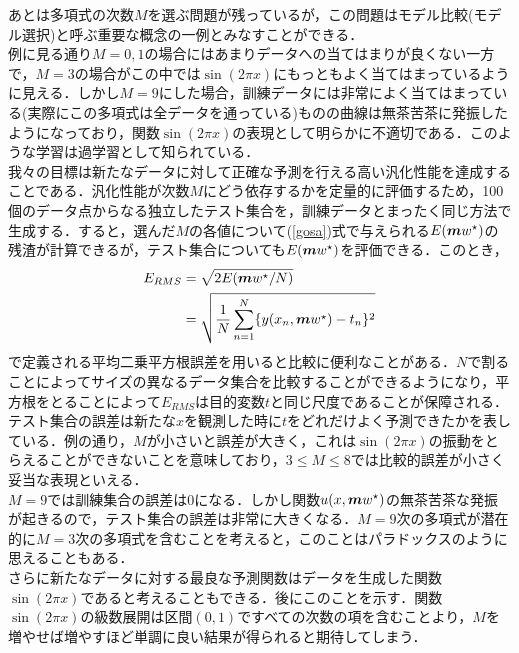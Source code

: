 \documentclass[a4j,11pt]{article}
\newcommand{\bm}{\mbox{\boldmath {$m$}}}
\begin{document}
あとは多項式の次数$M$を選ぶ問題が残っているが，この問題はモデル比較(モデル選択)と呼ぶ重要な概念の一例とみなすことができる．\\

例に見る通り$M=0,1$の場合にはあまりデータへの当てはまりが良くない一方で，$M=3$の場合がこの中では$\sin(2\pi x)$にもっともよく当てはまっているように見える．しかし$M=9$にした場合，訓練データには非常によく当てはまっている(実際にこの多項式は全データを通っている)ものの曲線は無茶苦茶に発振したようになっており，関数$\sin(2\pi x)$の表現として明らかに不適切である．このような学習は過学習として知られている．\\

我々の目標は新たなデータに対して正確な予測を行える高い汎化性能を達成することである．汎化性能が次数$M$にどう依存するかを定量的に評価するため，100個のデータ点からなる独立したテスト集合を，訓練データとまったく同じ方法で生成する．すると，選んだ$M$の各値について(\ref{gosa})式で与えられる$E(\bm w^{\star})$の残渣が計算できるが，テスト集合についても$E(\bm w^{\star})$を評価できる．このとき，
\begin{equation}
\begin{split}
  E_{RMS}&=\sqrt{2E(\bm w^{\star}/N)}\\
          &= \sqrt{\frac{1}{N}\sum_{n=1}^N \{y(x_n,\bm w^{\star}) - t_n\}^2}
\end{split}
\end{equation}
で定義される平均二乗平方根誤差を用いると比較に便利なことがある．$N$で割ることによってサイズの異なるデータ集合を比較することができるようになり，平方根をとることによって$E_{RMS}$は目的変数$t$と同じ尺度であることが保障される．テスト集合の誤差は新たな$x$を観測した時に$t$をどれだけよく予測できたかを表している．例の通り，$M$が小さいと誤差が大きく，これは$\sin(2\pi x)$の振動をとらえることができないことを意味しており，$3\leq M\leq 8$では比較的誤差が小さく妥当な表現といえる．\\

$M=9$では訓練集合の誤差は$0$になる．しかし関数$u(x,\bm w^{\star})$の無茶苦茶な発振が起きるので，テスト集合の誤差は非常に大きくなる．$M=9$次の多項式が潜在的に$M=3$次の多項式を含むことを考えると，このことはパラドックスのように思えることもある．\\
さらに新たなデータに対する最良な予測関数はデータを生成した関数$\sin (2\pi x)$であると考えることもできる．後にこのことを示す．関数$\sin (2\pi x)$の級数展開は区間$(0,1)$ですべての次数の項を含むことより，$M$を増やせば増やすほど単調に良い結果が得られると期待してしまう．\\
\end{document}

